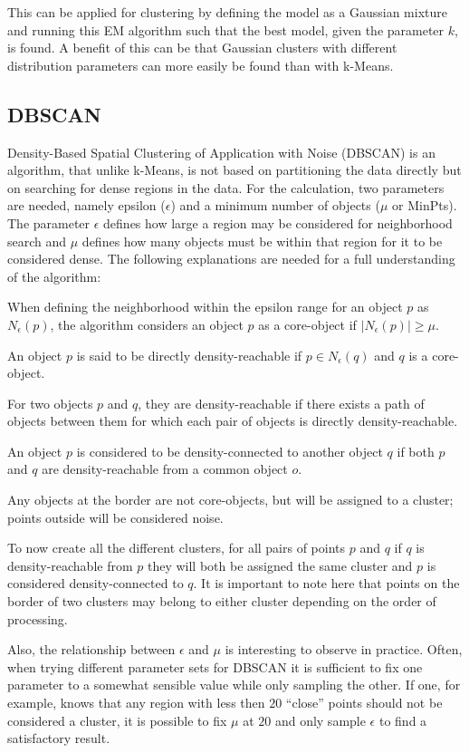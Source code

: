 \documentclass[
	a4paper,
	english,
	twoside,
	openright,               
	11pt                            
	]{report}
\begin{document}
This can be applied for clustering by defining the model as a Gaussian mixture and running this EM algorithm such that the best model, given the parameter $k$, is found. A benefit of this can be that Gaussian clusters with different distribution parameters can more easily be found than with k-Means.

\subsection{DBSCAN}
Density-Based Spatial Clustering of Application with Noise (DBSCAN) \cite{10.5555/3001460.3001507} is an algorithm, that unlike k-Means, is not based on partitioning the data directly but on searching for dense regions in the data. For the calculation, two parameters are needed, namely epsilon ($\epsilon$) and a minimum number of objects ($\mu$ or MinPts). The parameter $\epsilon$ defines how large a region may be considered for neighborhood search and $\mu$ defines how many objects must be within that region for it to be considered dense. The following explanations are needed for a full understanding of the algorithm:
\newline

When defining the neighborhood within the epsilon range for an object $p$ as $N_\epsilon(p)$, the algorithm considers an object $p$ as a core-object if $|N_\epsilon(p)|\geq \mu$.

An object $p$ is said to be directly density-reachable if $p\in N_\epsilon(q) $ and $q$ is a core-object.

For two objects $p$ and $q$, they are density-reachable if there exists a path of objects between them for which each pair of objects is directly density-reachable.

An object $p$ is considered to be density-connected to another object $q$ if both $p$ and $q$ are density-reachable from a common object $o$.

Any objects at the border are not core-objects, but will be assigned to a cluster; points outside will be considered noise.
\newline

To now create all the different clusters, for all pairs of points $p$ and $q$ if $q$ is density-reachable from $p$ they will both be assigned the same cluster and $p$ is considered density-connected to $q$. It is important to note here that points on the border of two clusters may belong to either cluster depending on the order of processing.

Also, the relationship between $\epsilon$ and $\mu$ is interesting to observe in practice. Often, when trying different parameter sets for DBSCAN it is sufficient to fix one parameter to a somewhat sensible value while only sampling the other. If one, for example, knows that any region with less then $20$ ``close'' points should not be considered a cluster, it is possible to fix $\mu$ at $20$ and only sample $\epsilon$ to find a satisfactory result.
\end{document}
